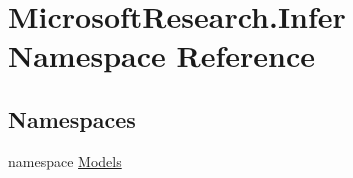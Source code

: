 \hypertarget{namespace_microsoft_research_1_1_infer}{}\section{Microsoft\+Research.\+Infer Namespace Reference}
\label{namespace_microsoft_research_1_1_infer}
\subsection*{Namespaces}
\begin{DoxyCompactItemize}
\item 
namespace \hyperlink{namespace_microsoft_research_1_1_infer_1_1_models}{Models}
\end{DoxyCompactItemize}
